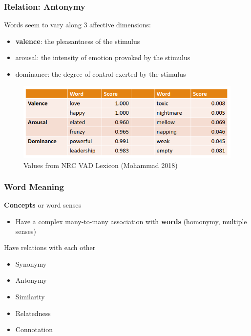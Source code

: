 \documentclass[13.5pt,aspecratio=169, xcolor=dvipsnames]{beamer}
\begin{document}
\begin{frame}
    \onehalfspacing
        \frametitle{Relation: Antonymy}
        \begin{block}{Words seem to vary along 3 affective dimensions:}
            \begin{itemize}
                \item \textbf{valence}: the pleasantness of the stimulus
                \item arousal: the intensity of emotion provoked by the stimulus
                \item dominance: the degree of control exerted by the stimulus
            \end{itemize}
        \end{block}

        \begin{figure}[h]
            \centering
            \includegraphics[width=\linewidth]{Antonymy.png}
            \captionsetup{labelformat=empty}
            \caption{Values from NRC VAD Lexicon (Mohammad 2018)}
        \end{figure}
    \end{frame}
   
    \begin{frame}
        \onehalfspacing
            \frametitle{Word Meaning}
            {\Large
            \textbf{Concepts} or word senses
            \begin{itemize}
                \item Have a complex many-to-many association with \textbf{words} (homonymy,
                multiple senses)
            \end{itemize}
            Have relations with each other
                \begin{itemize}
                    \item Synonymy
                    \item Antonymy
                    \item Similarity
                    \item Relatedness
                    \item Connotation
                \end{itemize} }
        \end{frame}
\end{document}
